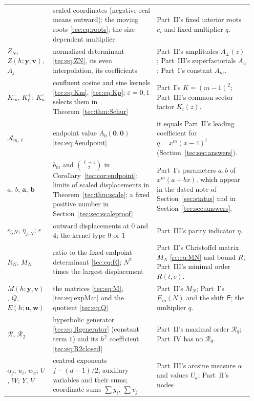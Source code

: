 \documentclass[11pt,a4paper]{article}
\numberwithin{equation}{section}
\theoremstyle{definition}
\theoremstyle{remark}
\newcommand{\by}{\boldsymbol{y}}
\newcommand{\E}{\mathsf E}
\newcommand{\Rzero}{\mathcal R_0}
\newcommand{\bv}{\boldsymbol v}
\newcommand{\ba}{\boldsymbol a}
\newcommand{\bb}{\boldsymbol b}
\newcommand{\bu}{\boldsymbol u}
\newcommand{\bw}{\boldsymbol w}
\begin{document}
\begin{longtable}{@{}>{\raggedright}p{}>{\raggedright}p{}>{\raggedright\arraybackslash}p{}@{}}
 & scaled coordinates (negative real means outward); the moving roots
   \eqref{tec:eq:roots}; the size-dependent multiplier
 & Part~II's fixed interior roots $c_i$ and fixed multiplier $q$.\\
$Z_N$, $Z(h;\by,\bv)$, $A_j$
 & normalized determinant \eqref{tec:eq:ZN}, its even interpolation, its
   coefficients
 & Part~II's amplitudes $A_\pm(z)$; Part~III's superfactorials $A_u$;
   Part~I's constant $A_m$.\\
$K_m^-$, $K_\ell^+$; $K_n^\varepsilon$
 & confluent cosine and sine kernels \eqref{tec:eq:Km}, \eqref{tec:eq:Kp};
   $\varepsilon=0,1$ selects them in Theorem~\ref{tec:thm:Schur}
 & Part~I's $K=(m-1)^2$; Part~III's common sector factor $K_t(z)$.\\
$\mathcal A_{m,\ell}$
 & endpoint value $A_0(\mathbf0,\mathbf0)$ \eqref{tec:eq:Aendpoint}
 & it equals Part~II's leading coefficient for $q=x^m(x-4)^\ell$
   (Section~\ref{tec:sec:answers}).\\
$a$, $b$; $\ba$, $\bb$
 & $b_m$ and $\binom{\ell+1}2$ in Corollary~\ref{tec:cor:endpoint}; limits
   of scaled displacements in Theorem~\ref{tec:thm:scale}; a fixed positive
   number in Section~\ref{tec:sec:scaleproof}
 & Part~I's parameters $a,b$ of $x^m(a+bx)$, which appear in the dated note
   of Section~\ref{sec:status} and in Section~\ref{tec:sec:answers}.\\
$\epsilon_{i,N}$, $\eta_{j,N}$; $\varepsilon$
 & outward displacements at $0$ and $4$; the kernel type $0$ or $1$
 & Part~III's parity indicator $\eta$.\\
$R_N$, $M_N$
 & ratio to the fixed-endpoint determinant \eqref{tec:eq:R}; $N^2$ times the
   largest displacement
 & Part~II's Christoffel matrix $M_N$ \eqref{rc:eq:MN} and bound $R$;
   Part~III's minimal order $R(t,c)$.\\
$M(h;\by,\bv)$, $Q$, $E(h;\bu,\bw)$
 & the matrices \eqref{tec:eq:M}, \eqref{tec:eq:expMat} and the quotient
   \eqref{tec:eq:Q}
 & Part~II's $M_N$; Part~I's $E_m(N)$ and the shift $\E$; the multiplier
   $q$.\\
$\mathcal R$, $\mathcal R_2$
 & hyperbolic generator \eqref{tec:eq:Rgenerator} (constant term $1$) and
   its $h^2$ coefficient \eqref{tec:eq:R2closed}
 & Part~II's maximal order $\Rzero$; Part~IV has no $\mathcal R_0$.\\
$\alpha_j$; $u_i$, $w_a$; $U$, $W$; $Y$, $V$
 & centred exponents $j-(d-1)/2$; auxiliary variables and their sums;
   coordinate sums $\sum y_i$, $\sum v_j$
 & Part~III's arcsine measure $\alpha$ and values $U_a$; Part~II's nodes

\end{longtable}
\end{document}
